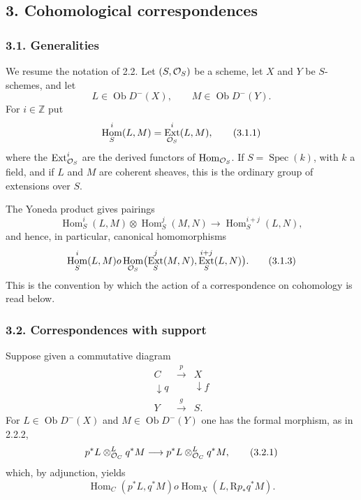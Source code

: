\documentclass[11pt]{article}
\theoremstyle{plain}
\theoremstyle{definition}
\theoremstyle{remark}
\newcommand{\ZZ}{\mathbb Z}
\DeclareMathOperator{\Spec}{Spec}
\DeclareMathOperator{\Hom}{Hom}
\DeclareMathOperator{\Ext}{Ext}
\DeclareMathOperator{\ob}{Ob}
\newcommand{\R}{\mathrm R}
\begin{document}
\subsection*{3. Cohomological correspondences}

\subsubsection*{3.1. Generalities}
We resume the notation of 2.2. Let $(S,\mathcal O_S)$ be a scheme, let $X$ and $Y$ be $S$-schemes, and let
\[
   L\in\ob D^{-}(X), \qquad M\in\ob D^{-}(Y).
\]
For $i\in \ZZ$ put
\begin{equation}
   \Hom^i_S(L,M)=\Ext^i_{\cO_S}(L,M),
   \tag{3.1.1}
\end{equation}
where the $\Ext^i_{\cO_S}$ are the derived functors of $\Hom_{\cO_S}$. If $S=\Spec(k)$, with $k$ a field, and if $L$ and $M$ are coherent sheaves, this is the ordinary group of extensions over $S$.

The Yoneda product gives pairings
\begin{equation}
   \Hom^i_S(L,M)\otimes \Hom^j_S(M,N)
      \longrightarrow \Hom^{i+j}_S(L,N),
   \tag{3.1.2}
\end{equation}
and hence, in particular, canonical homomorphisms
\begin{equation}
   \Hom^i_S(L,M)	o
   \Hom_{\cO_S}\bigl(\Ext^j_S(M,N),\Ext^{i+j}_S(L,N)\bigr).
   \tag{3.1.3}
\end{equation}
This is the convention by which the action of a correspondence on cohomology is read below.

\subsubsection*{3.2. Correspondences with support}
Suppose given a commutative diagram
\[
\begin{array}{ccc}
C & \xrightarrow{p} & X \\
\downarrow q & & \downarrow f \\
Y & \xrightarrow{g} & S .
\end{array}
\]
For $L\in\ob D^{-}(X)$ and $M\in\ob D^{-}(Y)$ one has the formal morphism, as in 2.2.2,
\begin{equation}
   p^*L\otimes^L_{\mathcal O_C}q^*M
      \longrightarrow p^*L\otimes^L_{\mathcal O_C}q^*M,
   \tag{3.2.1}
\end{equation}
which, by adjunction, yields
\begin{equation}
   \Hom_C(p^*L,q^*M)	o \Hom_X(L,\R p_*q^*M).
   \tag{3.2.2}
\end{equation}
\end{document}
